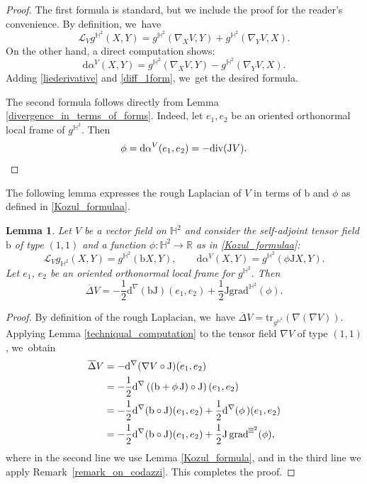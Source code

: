 \documentclass[11pt]{article}
\makeatletter
\DeclareRobustCommand{\mathbbm}[1]{\csname jepbb@#1\endcsname}
\theoremstyle{plain}
\newtheorem{lemma}[cor]{Lemma}
\theoremstyle{definition}
\newcommand{\grad}{\mathrm{grad}^{\mathbb{H}^2}}
\newcommand{\J}{\mathrm{J}}
\makeatother
\begin{document}
\begin{proof}
The first formula is standard, but we include the proof for the reader's convenience. By definition, we~have
\begin{equation}\label{liederivative}
\mathcal{L}_Vg^{\mathbb{H}^2}(X,Y)=g^{\mathbb{H}^2}(\nabla_XV,Y)+g^{\mathbb{H}^2}(\nabla_YV,X).
\end{equation}
On the other hand, a direct computation shows:
\begin{equation}\label{diff_1form}
\mathrm{d}\alpha^V(X,Y)=g^{\mathbb{H}^2}(\nabla_XV,Y)-g^{\mathbb{H}^2}(\nabla_YV,X).
\end{equation}
Adding \eqref{liederivative} and \eqref{diff_1form}, we~get the desired formula.

The second formula follows directly from Lemma \ref{divergence_in_terms_of_forms}. Indeed, let $e_1, e_2$ be an oriented orthonormal local frame of $g^{\mathbb{H}^2}$. Then
\[
\phi=\mathrm{d}\alpha^V(e_1,e_2)=-\mathrm{div}(\mathrm{J} V). \qedhere
\]
\end{proof}
The following lemma expresses the rough Laplacian of \(V \) in terms of \(\mathrm{b} \) and \(\phi \) as defined in \eqref{Kozul_formulaa}.
\begin{lemma}\label{prepa1_CH_HL}
Let $V$ be a vector field on $\mathbb{H}^2$ and consider the self-adjoint tensor field $\mathrm{b}$ of type $(1,1)$ and a function $\phi:\mathbb{H}^2\to \mathbb{R}$ as in \eqref{Kozul_formulaa}:
\[
\mathcal{L}_Vg_{\mathbb{H}^2}(X,Y)=g^{\mathbb{H}^2}(\mathrm{b} X,Y),\qquad \mathrm{d}\alpha^V(X,Y)=g^{\mathbb{H}^2}(\phi \J X,Y).
\]Let $e_1$, $e_2$ be an oriented orthonormal local frame for $g^{\mathbb{H}^2}$. Then
\[
\overline{\Delta}V=-\frac{1}{2}\mathrm{d}^{\nabla}(\mathrm{b}\J)(e_1,e_2)+\frac{1}{2}\J\grad(\phi).
\]
\end{lemma}

\begin{proof}
By definition of the rough Laplacian, we~have \(\overline{\Delta}V = \mathrm{tr}_{g^{\mathbb{H}^2}}(\nabla (\nabla V))\). Applying Lemma \ref{techniqual_computation} to the tensor field \(\nabla V\) of type $(1,1)$, we~obtain
\begin{align*}
\overline{\Delta} V &= -\mathrm{d}^{\nabla}(\nabla V \circ \mathrm{J})(e_1,e_2) \\
&= -\frac{1}{2} \mathrm{d}^{\nabla}\left((\mathrm{b} + \phi\, \mathrm{J}) \circ \mathrm{J}\right) (e_1,e_2)\\
&= -\frac{1}{2} \mathrm{d}^{\nabla}(\mathrm{b} \circ \mathrm{J})(e_1,e_2) + \frac{1}{2} \mathrm{d}^{\nabla}(\phi\, \mathbbm{1})(e_1,e_2) \\
&= -\frac{1}{2} \mathrm{d}^{\nabla}(\mathrm{b} \circ \mathrm{J})(e_1,e_2) + \frac{1}{2} \mathrm{J} \, \mathrm{grad}^{\mathbb{H}^2}(\phi),
\end{align*}
where in the second line we use Lemma \ref{Kozul_formula}, and in the third line we apply Remark~\ref{remark_on_codazzi}. This completes the proof.
\end{proof}
\end{document}
